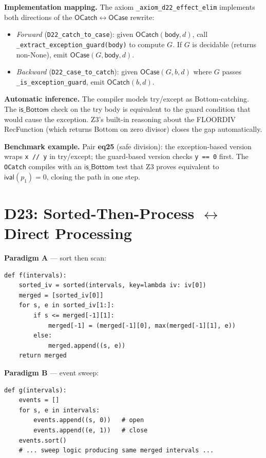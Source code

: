 \documentclass[11pt,a4paper]{report}
\theoremstyle{definition}
\theoremstyle{plain}
\begin{document}
\textbf{Implementation mapping.}
The axiom \texttt{\_axiom\_d22\_effect\_elim} implements both
directions of the $\mathsf{OCatch} \leftrightarrow \mathsf{OCase}$
rewrite:
\begin{itemize}
  \item \emph{Forward} (\texttt{D22\_catch\_to\_case}): given
    $\mathsf{OCatch}(\mathsf{body}, d)$, call
    \texttt{\_extract\_exception\_guard(body)} to compute
    $G$.  If $G$ is decidable (returns non-None), emit
    $\mathsf{OCase}(G, \mathsf{body}, d)$.
  \item \emph{Backward} (\texttt{D22\_case\_to\_catch}): given
    $\mathsf{OCase}(G, b, d)$ where $G$ passes
    \texttt{\_is\_exception\_guard}, emit
    $\mathsf{OCatch}(b, d)$.
\end{itemize}

\textbf{Automatic inference.}
The compiler models try/except as Bottom-catching.  The
$\mathsf{is\_Bottom}$ check on the try body is equivalent to the
guard condition that would cause the exception.  Z3's built-in
reasoning about the FLOORDIV RecFunction (which returns Bottom on
zero divisor) closes the gap automatically.

\textbf{Benchmark example.}
Pair \textbf{eq25} (safe division): the exception-based version
wraps \texttt{x // y} in try/except; the guard-based version checks
\texttt{y == 0} first.  The \texttt{OCatch} compiles with an
$\mathsf{is\_Bottom}$ test that Z3 proves equivalent to
$\mathsf{ival}(p_1) = 0$, closing the path in one step.

\section{D23: Sorted-Then-Process $\leftrightarrow$ Direct Processing}

\textbf{Paradigm A} --- sort then scan:
\begin{lstlisting}
def f(intervals):
    sorted_iv = sorted(intervals, key=lambda iv: iv[0])
    merged = [sorted_iv[0]]
    for s, e in sorted_iv[1:]:
        if s <= merged[-1][1]:
            merged[-1] = (merged[-1][0], max(merged[-1][1], e))
        else:
            merged.append((s, e))
    return merged
\end{lstlisting}

\textbf{Paradigm B} --- event sweep:
\begin{lstlisting}
def g(intervals):
    events = []
    for s, e in intervals:
        events.append((s, 0))   # open
        events.append((e, 1))   # close
    events.sort()
    # ... sweep logic producing same merged intervals ...
\end{lstlisting}
\end{document}
